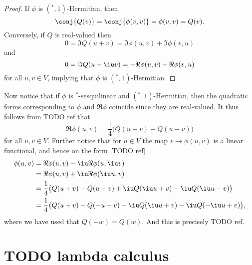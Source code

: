 \documentclass[a4paper, 11pt]{memoir}
\theoremstyle{plaincustomnumber}
\theoremstyle{changedotbreakcustomnumber}
\begin{document}
\begin{proof}
    If $\phi$ is $({}^*,1)$-Hermitian, then
    \begin{equation*}
        \conj{Q(v)}
            = \conj{\phi(v,v)}
            = \phi(v,v)
            = Q(v).
    \end{equation*}
    Conversely, if $Q$ is real-valued then
    \begin{equation*}
        0
            = \Im Q(u+v)
            = \Im \phi(u,v) + \Im \phi(v,u)
    \end{equation*}
    and
    \begin{equation*}
        0
            = \Im Q(u+\iu v)
            = - \Re \phi(u,v) + \Re \phi(v,u)
    \end{equation*}
    for all $u,v \in V$, implying that $\phi$ is $({}^*,1)$-Hermitian.
\end{proof}
%
Now notice that if $\phi$ is ${}^*$-sesquilinear and $({}^*,1)$-Hermitian, then the quadratic forms corresponding to $\phi$ and $\Re \phi$ coincide since they are real-valued. It thus follows from TODO ref that
%
\begin{equation*}
    \Re \phi(u,v)
        = \frac{1}{4} \bigl( Q(u+v) - Q(u-v) \bigr)
\end{equation*}
%
for all $u,v \in V$. Further notice that for $u \in V$ the map $v \mapsto \phi(u,v)$ is a linear functional, and hence on the form [TODO ref]
%
\begin{align*}
    \phi(u,v)
        &= \Re \phi(u,v) - \iu \Re \phi(u, \iu v) \\
        &= \Re \phi(u,v) + \iu \Re \phi(\iu u, v) \\
        &= \frac{1}{4} \bigl( Q(u+v) - Q(u-v) + \iu Q(\iu u + v) - \iu Q(\iu u - v) \bigr) \\
        &= \frac{1}{4} \bigl( Q(u+v) - Q(-u+v) + \iu Q(\iu u + v) - \iu Q(-\iu u + v) \bigr),
\end{align*}
%
where we have used that $Q(-w) = Q(w)$. And this is precisely TODO ref.





\chapter{TODO lambda calculus}

\newcommand{\varset}{\mathit{Vars}}
\newcommand{\vars}{\mathit{V}}
\newcommand{\freevars}{\mathit{FV}}
\newcommand{\boundvars}{\mathit{BV}}
\newcommand{\subterm}{\mathrm{Sub}}
\newcommand{\syntaxdefn}{\vcentcolon\equiv}
\end{document}
